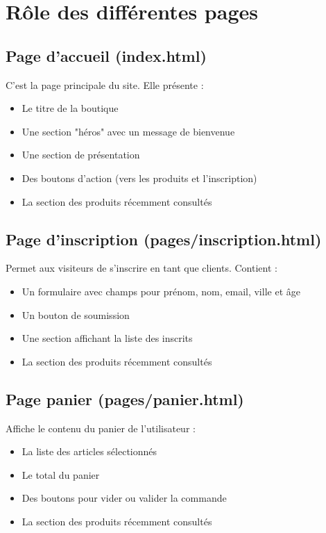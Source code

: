 \documentclass[12pt,a4paper]{article}
\begin{document}
\section{Rôle des différentes pages}

\subsection{Page d'accueil (index.html)}
C'est la page principale du site. Elle présente :
\begin{itemize}
\item Le titre de la boutique
\item Une section "héros" avec un message de bienvenue
\item Une section de présentation
\item Des boutons d'action (vers les produits et l'inscription)
\item La section des produits récemment consultés
\end{itemize}

\subsection{Page d'inscription (pages/inscription.html)}
Permet aux visiteurs de s'inscrire en tant que clients. Contient :
\begin{itemize}
\item Un formulaire avec champs pour prénom, nom, email, ville et âge
\item Un bouton de soumission
\item Une section affichant la liste des inscrits
\item La section des produits récemment consultés
\end{itemize}

\subsection{Page panier (pages/panier.html)}
Affiche le contenu du panier de l'utilisateur :
\begin{itemize}
\item La liste des articles sélectionnés
\item Le total du panier
\item Des boutons pour vider ou valider la commande
\item La section des produits récemment consultés
\end{itemize}
\end{document}
